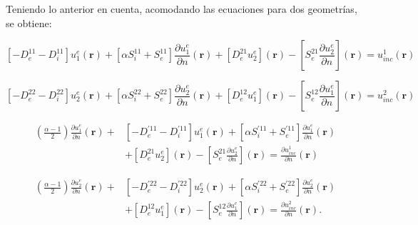 \documentclass[12pt,letterpaper]{article}
\numberwithin{equation}{section}
\begin{document}
Teniendo lo anterior en cuenta, acomodando las ecuaciones para dos geometrías, se obtiene:

\begin{equation}
\left[-D_{e}^{11} - D_{i}^{11}\right] u^{e}_1(\textbf{r}) + \left[\alpha S_{i}^{11} + S_{e}^{11}\right]\frac{\partial u^{e}_1}{\partial n}(\textbf{r}) + \left[D_{e}^{21} u^{e}_2\right](\textbf{r}) - \left[S_{e}^{21} \frac{\partial u^{e}_2}{\partial n}\right](\textbf{r}) = u_{inc}^1(\textbf{r}) 
\label{eq: multi_trans_1}		
\end{equation}

\begin{equation}
\left[-D_{e}^{22} - D_{i}^{22}\right] u^{e}_2(\textbf{r}) + \left[\alpha S_{i}^{22} + S_{e}^{22}\right]\frac{\partial u^{e}_2}{\partial n}(\textbf{r}) + \left[D_{e}^{12} u^{e}_1\right](\textbf{r}) - \left[S_{e}^{12} \frac{\partial u^{e}_1}{\partial n}\right](\textbf{r}) = u_{inc}^2(\textbf{r}) 
\label{eq: multi_trans_2}		
\end{equation}

\begin{equation}
\begin{split}
(\frac{\alpha - 1}{2})\frac{\partial u^{e}_1}{\partial n}(\textbf{r}) + &\left[-D_{e}^{'11} - D_{i}^{'11}\right] u^{e}_1(\textbf{r}) + \left[\alpha S_{i}^{'11} + S_{e}^{'11}\right]\frac{\partial u^{e}_1}{\partial n}(\textbf{r})\\
&+ \left[D_{e}^{21} u^{e}_2\right](\textbf{r}) - \left[S_{e}^{21} \frac{\partial u^{e}_2}{\partial n}\right](\textbf{r}) = \frac{\partial u_{inc}^1}{\partial n}(\textbf{r}) 
\end{split}
\label{eq: multi_trans_deriv_1}		
\end{equation}

\begin{equation}
\begin{split}
(\frac{\alpha - 1}{2})\frac{\partial u^{e}_2}{\partial n}(\textbf{r}) + &\left[-D_{e}^{'22} - D_{i}^{'22}\right] u^{e}_2(\textbf{r}) + \left[\alpha S_{i}^{'22} + S_{e}^{'22}\right]\frac{\partial u^{e}_2}{\partial n}(\textbf{r})\\
&+ \left[D_{e}^{12} u^{e}_1\right](\textbf{r}) - \left[S_{e}^{12} \frac{\partial u^{e}_1}{\partial n}\right](\textbf{r}) = \frac{\partial u_{inc}^2}{\partial n}(\textbf{r}). 
\end{split}
\label{eq: multi_trans_deriv_2}		
\end{equation}
\end{document}
